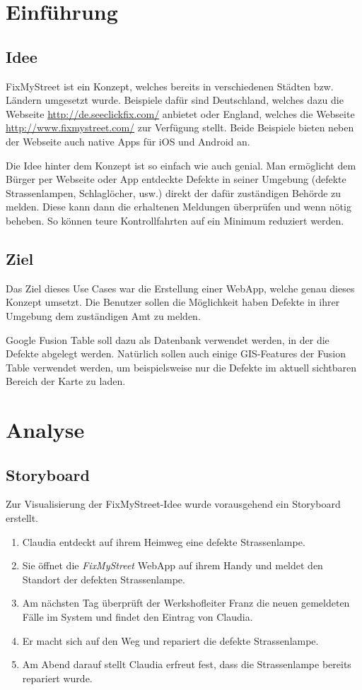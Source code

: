 \section{Einführung}
\subsection{Idee}
FixMyStreet ist ein Konzept, welches bereits in verschiedenen Städten bzw. Ländern umgesetzt wurde. Beispiele dafür sind Deutschland, welches dazu die Webseite  \url{http://de.seeclickfix.com/} anbietet oder England, welches die Webseite \url{http://www.fixmystreet.com/} zur Verfügung stellt. Beide Beispiele bieten neben der Webseite auch native Apps für iOS und Android an.

Die Idee hinter dem Konzept ist so einfach wie auch genial. Man ermöglicht dem Bürger per Webseite oder App entdeckte Defekte in seiner Umgebung (defekte Strassenlampen, Schlaglöcher, usw.) direkt der dafür zuständigen Behörde zu melden. Diese kann dann die erhaltenen Meldungen überprüfen und wenn nötig beheben. So können teure Kontrollfahrten auf ein Minimum reduziert werden.

\subsection{Ziel}
Das Ziel dieses Use Cases war die Erstellung einer \gls{WebApp}, welche genau dieses Konzept umsetzt. Die Benutzer sollen die Möglichkeit haben Defekte in ihrer Umgebung dem zuständigen Amt zu melden.

Google Fusion Table soll dazu als Datenbank verwendet werden, in der die Defekte abgelegt werden. Natürlich sollen auch einige \gls{GIS}-Features der Fusion Table verwendet werden, um beispielsweise nur die Defekte im aktuell sichtbaren Bereich der Karte zu laden.

\section{Analyse}

\subsection{Storyboard}
Zur Visualisierung der FixMyStreet-Idee wurde vorausgehend ein Storyboard erstellt.

\begin{enumerate}
\item Claudia entdeckt auf ihrem Heimweg eine defekte Strassenlampe.
\item Sie öffnet die \emph{FixMyStreet} \gls{WebApp} auf ihrem Handy und meldet den Standort der defekten Strassenlampe.
\item Am nächsten Tag überprüft der Werkshofleiter Franz die neuen gemeldeten Fälle im System und findet den Eintrag von Claudia.
\item Er macht sich auf den Weg und repariert die defekte Strassenlampe.
\item Am Abend darauf stellt Claudia erfreut fest, dass die Strassenlampe bereits repariert wurde.
\end{enumerate}

